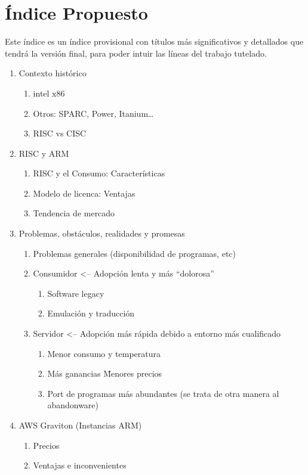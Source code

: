 \documentclass[a4paper,openright,12pt]{article}
\begin{document}
\section{Índice Propuesto}
Este índice es un índice provisional con títulos más significativos y detallados que tendrá la versión final, para poder intuir las líneas del trabajo tutelado.
\begin{enumerate}[1.]
\item Contexto histórico
\begin{enumerate}[1.]
    \item intel x86
    \item Otros: SPARC, Power, Itanium\ldots
    \item RISC vs CISC
\end{enumerate}

\item RISC y ARM
\begin{enumerate}[1.]
    \item RISC y el Consumo: Características
    \item Modelo de licenca: Ventajas
    \item Tendencia de mercado
\end{enumerate}

\item Problemas, obstáculos, realidades y promesas
\begin{enumerate}[1.]
    \item Problemas generales (disponibilidad de programas, etc)
    \item Consumidor <-- Adopción lenta y más ``dolorosa''
    \begin{enumerate}[1.]
        \item Software legacy
        \item Emulación y traducción
    \end{enumerate}
    \item Servidor <-- Adopción más rápida debido a entorno más cualificado
    \begin{enumerate}[1.]
        \item Menor consumo y temperatura
        \item Más ganancias \= Menores precios
        \item Port de programas más abundantes (se trata de otra manera al abandonware)
    \end{enumerate}
\end{enumerate}

\item AWS Graviton (Instancias ARM)
\begin{enumerate}[1.]
    \item Precios
    \item Ventajas e inconvenientes
\end{enumerate}


\end{enumerate}
\end{document}
